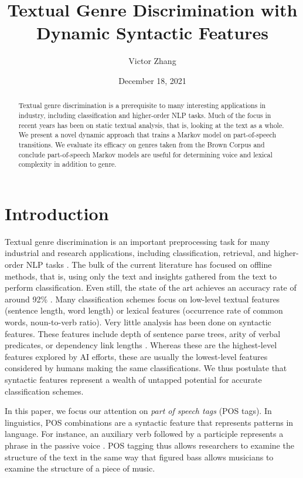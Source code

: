 \documentclass{article}
\title{Textual Genre Discrimination with Dynamic Syntactic Features}
\author{Victor Zhang}
\date{December 18, 2021}
\begin{document}
\maketitle

\begin{abstract}
Textual genre discrimination is a prerequisite to many interesting applications in industry, including classification and higher-order NLP tasks. Much of the focus in recent years has been on static textual analysis, that is, looking at the text as a whole. We present a novel dynamic approach that trains a Markov model on part-of-speech transitions. We evaluate its efficacy on genres taken from the Brown Corpus and conclude part-of-speech Markov models are useful for determining voice and lexical complexity in addition to genre.
\end{abstract}

\section{Introduction}
Textual genre discrimination is an important preprocessing task for many industrial and research applications, including classification, retrieval, and higher-order NLP tasks \cite{LeeMyaeng}. The bulk of the current literature has focused on offline methods, that is, using only the text and insights gathered from the text to perform classification. Even still, the state of the art achieves an accuracy rate of around 92\% \cite{SoA}. Many classification schemes focus on low-level textual features (sentence length, word length) or lexical features (occurrence rate of common words, noun-to-verb ratio)\cite{KitchSink}. Very little analysis has been done on syntactic features. These features include depth of sentence parse trees, arity of verbal predicates, or dependency link lengths \cite{Italian}. Whereas these are the highest-level features explored by AI efforts, these are usually the lowest-level features considered by humans making the same classifications. We thus postulate that syntactic features represent a wealth of untapped potential for accurate classification schemes.

In this paper, we focus our attention on \textit{part of speech tags} (POS tags). In linguistics, POS combinations are a syntactic feature that represents patterns in language. For instance, an auxiliary verb followed by a participle represents a phrase in the passive voice \cite{POS} \cite{LingAuto}. POS tagging thus allows researchers to examine the structure of the text in the same way that figured bass allows musicians to examine the structure of a piece of music.
\end{document}
